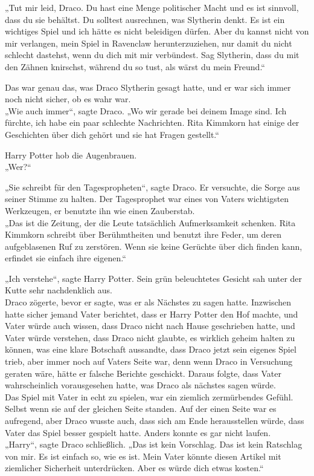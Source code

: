 {„Tut mir leid, Draco. Du hast eine Menge politischer Macht und es ist sinnvoll, dass du sie behältst. Du solltest ausrechnen, was Slytherin denkt. Es ist ein wichtiges Spiel und ich hätte es nicht beleidigen dürfen. Aber du kannst nicht von mir verlangen, mein Spiel in Ravenclaw herunterzuziehen, nur damit du nicht schlecht dastehst, wenn du dich mit mir verbündest. Sag Slytherin, dass du mit den Zähnen knirschst, während du so tust, als wärst du mein Freund.“

Das war genau das, was Draco Slytherin gesagt hatte, und er war sich immer noch nicht sicher, ob es wahr war.\\ „Wie auch immer“, sagte Draco. „Wo wir gerade bei deinem Image sind. Ich fürchte, ich habe ein paar schlechte Nachrichten. Rita Kimmkorn hat einige der Geschichten über dich gehört und sie hat Fragen gestellt.“

Harry Potter hob die Augenbrauen.\\ „Wer?“

„Sie schreibt für den Tagespropheten“, sagte Draco. Er versuchte, die Sorge aus seiner Stimme zu halten. Der Tagesprophet war eines von Vaters wichtigsten Werkzeugen, er benutzte ihn wie einen Zauberstab.\\ „Das ist die Zeitung, der die Leute tatsächlich Aufmerksamkeit schenken. Rita Kimmkorn schreibt über Berühmtheiten und benutzt ihre Feder, um deren aufgeblasenen Ruf zu zerstören. Wenn sie keine Gerüchte über dich finden kann, erfindet sie einfach ihre eigenen.“

„Ich verstehe“, sagte Harry Potter. Sein grün beleuchtetes Gesicht sah unter der Kutte sehr nachdenklich aus.\\ Draco zögerte, bevor er sagte, was er als Nächstes zu sagen hatte. Inzwischen hatte sicher jemand Vater berichtet, dass er Harry Potter den Hof machte, und Vater würde auch wissen, dass Draco nicht nach Hause geschrieben hatte, und Vater würde verstehen, dass Draco nicht glaubte, es wirklich geheim halten zu können, was eine klare Botschaft aussandte, dass Draco jetzt sein eigenes Spiel trieb, aber immer noch auf Vaters Seite war, denn wenn Draco in Versuchung geraten wäre, hätte er falsche Berichte geschickt. Daraus folgte, dass Vater wahrscheinlich vorausgesehen hatte, was Draco als nächstes sagen würde.\\ Das Spiel mit Vater in echt zu spielen, war ein ziemlich zermürbendes Gefühl. Selbst wenn sie auf der gleichen Seite standen. Auf der einen Seite war es aufregend, aber Draco wusste auch, dass sich am Ende herausstellen würde, dass Vater das Spiel besser gespielt hatte. Anders konnte es gar nicht laufen.\\ „Harry“, sagte Draco schließlich. „Das ist kein Vorschlag. Das ist kein Ratschlag von mir. Es ist einfach so, wie es ist. Mein Vater könnte diesen Artikel mit ziemlicher Sicherheit unterdrücken. Aber es würde dich etwas kosten.“

}
